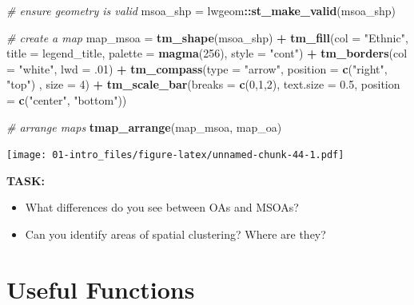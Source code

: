 \documentclass[]{book}
\newenvironment{Shaded}{\begin{snugshade}}{\end{snugshade}}
\newcommand{\CommentTok}[1]{\textcolor[rgb]{0.56,0.35,0.01}{\textit{#1}}}
\newcommand{\DataTypeTok}[1]{\textcolor[rgb]{0.13,0.29,0.53}{#1}}
\newcommand{\DecValTok}[1]{\textcolor[rgb]{0.00,0.00,0.81}{#1}}
\newcommand{\FloatTok}[1]{\textcolor[rgb]{0.00,0.00,0.81}{#1}}
\newcommand{\KeywordTok}[1]{\textcolor[rgb]{0.13,0.29,0.53}{\textbf{#1}}}
\newcommand{\NormalTok}[1]{#1}
\newcommand{\OperatorTok}[1]{\textcolor[rgb]{0.81,0.36,0.00}{\textbf{#1}}}
\newcommand{\StringTok}[1]{\textcolor[rgb]{0.31,0.60,0.02}{#1}}
\providecommand{\tightlist}{%
  \setlength{\itemsep}{0pt}\setlength{\parskip}{0pt}}
\begin{document}
\begin{Shaded}
\begin{Highlighting}[]
\CommentTok{# ensure geometry is valid}
\NormalTok{msoa_shp =}\StringTok{ }\NormalTok{lwgeom}\OperatorTok{::}\KeywordTok{st_make_valid}\NormalTok{(msoa_shp)}

\CommentTok{# create a map}
\NormalTok{map_msoa =}\StringTok{ }\KeywordTok{tm_shape}\NormalTok{(msoa_shp) }\OperatorTok{+}
\StringTok{  }\KeywordTok{tm_fill}\NormalTok{(}\DataTypeTok{col =} \StringTok{"Ethnic"}\NormalTok{, }\DataTypeTok{title =}\NormalTok{ legend_title, }\DataTypeTok{palette =} \KeywordTok{magma}\NormalTok{(}\DecValTok{256}\NormalTok{), }\DataTypeTok{style =} \StringTok{"cont"}\NormalTok{) }\OperatorTok{+}\StringTok{ }
\StringTok{  }\KeywordTok{tm_borders}\NormalTok{(}\DataTypeTok{col =} \StringTok{"white"}\NormalTok{, }\DataTypeTok{lwd =} \FloatTok{.01}\NormalTok{)  }\OperatorTok{+}\StringTok{ }
\StringTok{  }\KeywordTok{tm_compass}\NormalTok{(}\DataTypeTok{type =} \StringTok{"arrow"}\NormalTok{, }\DataTypeTok{position =} \KeywordTok{c}\NormalTok{(}\StringTok{"right"}\NormalTok{, }\StringTok{"top"}\NormalTok{) , }\DataTypeTok{size =} \DecValTok{4}\NormalTok{) }\OperatorTok{+}\StringTok{ }
\StringTok{  }\KeywordTok{tm_scale_bar}\NormalTok{(}\DataTypeTok{breaks =} \KeywordTok{c}\NormalTok{(}\DecValTok{0}\NormalTok{,}\DecValTok{1}\NormalTok{,}\DecValTok{2}\NormalTok{), }\DataTypeTok{text.size =} \FloatTok{0.5}\NormalTok{, }\DataTypeTok{position =}  \KeywordTok{c}\NormalTok{(}\StringTok{"center"}\NormalTok{, }\StringTok{"bottom"}\NormalTok{)) }

\CommentTok{# arrange maps }
\KeywordTok{tmap_arrange}\NormalTok{(map_msoa, map_oa) }
\end{Highlighting}
\end{Shaded}

\texttt{[image: 01-intro\_files/figure-latex/unnamed-chunk-44-1.pdf]}

\textbf{TASK:}

\begin{itemize}
\tightlist
\item
  What differences do you see between OAs and MSOAs?
\item
  Can you identify areas of spatial clustering? Where are they?
\end{itemize}

\hypertarget{useful-functions}{%
\section{Useful Functions}\label{useful-functions}}
\end{document}
